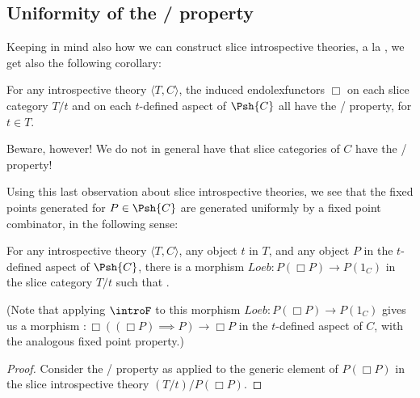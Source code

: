 \subsection{Uniformity of the \Loeb/ property}
Keeping in mind also how we can construct slice introspective theories, a la , we get also the following corollary:
\begin{corollary}\label{IntrospTransfersEverywhere}
For any introspective theory $\langle T, C \rangle$, the induced endolexfunctors $\Box$ on each slice category $T/t$ and on each $t$-defined aspect of $\Psh{C}$ all have the \Loeb/ property, for $t \in T$.
\end{corollary}

Beware, however! We do not in general have that slice categories of $C$ have the \Loeb/ property! 

Using this last observation about slice introspective theories, we see that the fixed points generated for $P \in \Psh{C}$ are generated uniformly by a fixed point combinator, in the following sense:
\begin{theorem}
For any introspective theory $\langle T, C \rangle$, any object $t$ in $T$, and any object $P$ in the $t$-defined aspect of $\Psh{C}$, there is a morphism $Loeb : P(\Box P) \to P(1_C)$ in the slice category $T/t$ such that \TODO.

(Note that applying $\introF$ to this morphism $Loeb : P(\Box P) \to P(1_C)$ gives us a morphism $: \Box((\Box P) \implies P) \to \Box P$ in the $t$-defined aspect of $C$, with the analogous fixed point property.)
\end{theorem}
\begin{proof}
Consider the \Loeb/ property as applied to the generic element of $P(\Box P)$ in the slice introspective theory $(T/t)/P(\Box P)$.
\end{proof}

